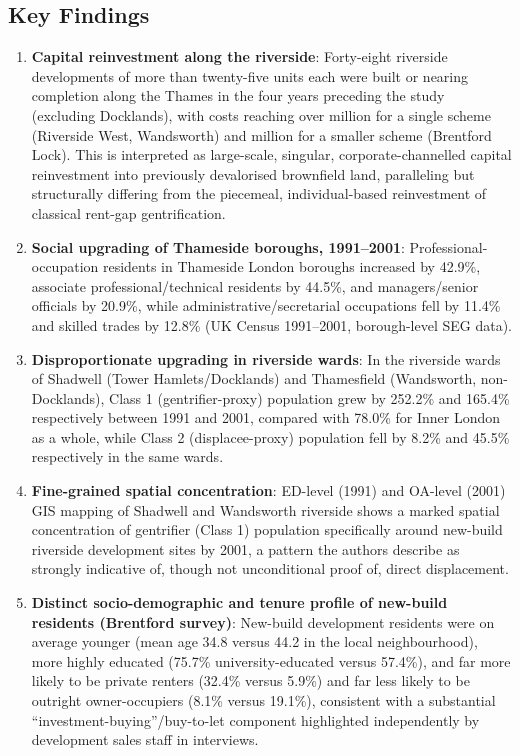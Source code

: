 \subsection*{Key Findings}

\begin{enumerate}
  \item \textbf{Capital reinvestment along the riverside}: Forty-eight riverside developments of more than twenty-five units each were built or nearing completion along the Thames in the four years preceding the study (excluding Docklands), with costs reaching over  million for a single scheme (Riverside West, Wandsworth) and  million for a smaller scheme (Brentford Lock). This is interpreted as large-scale, singular, corporate-channelled capital reinvestment into previously devalorised brownfield land, paralleling but structurally differing from the piecemeal, individual-based reinvestment of classical rent-gap gentrification.
  \item \textbf{Social upgrading of Thameside boroughs, 1991--2001}: Professional-occupation residents in Thameside London boroughs increased by 42.9\%, associate professional/technical residents by 44.5\%, and managers/senior officials by 20.9\%, while administrative/secretarial occupations fell by 11.4\% and skilled trades by 12.8\% (UK Census 1991--2001, borough-level SEG data).
  \item \textbf{Disproportionate upgrading in riverside wards}: In the riverside wards of Shadwell (Tower Hamlets/Docklands) and Thamesfield (Wandsworth, non-Docklands), Class 1 (gentrifier-proxy) population grew by 252.2\% and 165.4\% respectively between 1991 and 2001, compared with 78.0\% for Inner London as a whole, while Class 2 (displacee-proxy) population fell by 8.2\% and 45.5\% respectively in the same wards.
  \item \textbf{Fine-grained spatial concentration}: ED-level (1991) and OA-level (2001) GIS mapping of Shadwell and Wandsworth riverside shows a marked spatial concentration of gentrifier (Class 1) population specifically around new-build riverside development sites by 2001, a pattern the authors describe as strongly indicative of, though not unconditional proof of, direct displacement.
  \item \textbf{Distinct socio-demographic and tenure profile of new-build residents (Brentford survey)}: New-build development residents were on average younger (mean age 34.8 versus 44.2 in the local neighbourhood), more highly educated (75.7\% university-educated versus 57.4\%), and far more likely to be private renters (32.4\% versus 5.9\%) and far less likely to be outright owner-occupiers (8.1\% versus 19.1\%), consistent with a substantial ``investment-buying''/buy-to-let component highlighted independently by development sales staff in interviews.

\end{enumerate}
